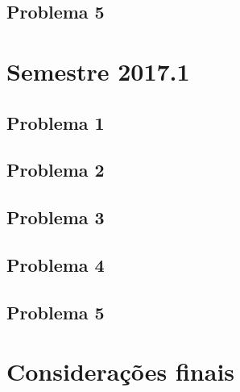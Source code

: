 \subsection{Problema 5}
\section{Semestre 2017.1}
\subsection{Problema 1}
\subsection{Problema 2}
\subsection{Problema 3}
\subsection{Problema 4}
\subsection{Problema 5}
\section{Considerações finais}
